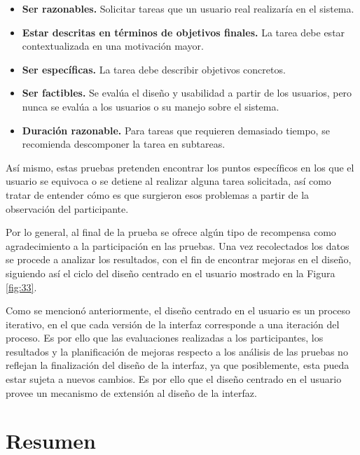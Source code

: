 \begin{itemize}
  \item \textbf{Ser razonables.} Solicitar tareas que un usuario real realizaría en el sistema.
  \item \textbf{Estar descritas en términos de objetivos finales.} La tarea debe estar contextualizada en una motivación mayor.
  \item \textbf{Ser específicas.} La tarea debe describir objetivos concretos.
  \item \textbf{Ser factibles.} Se evalúa el diseño y usabilidad a partir de los usuarios, pero nunca se evalúa a los usuarios o su manejo sobre el sistema.
  \item \textbf{Duración razonable.} Para tareas que requieren demasiado tiempo, se recomienda descomponer la tarea en subtareas.
\end{itemize}

Así mismo, estas pruebas pretenden encontrar los puntos específicos en los que el usuario se equivoca o se detiene al realizar alguna tarea solicitada, así como tratar de entender cómo es que surgieron esos problemas a partir de la observación del participante.

Por lo general, al final de la prueba se ofrece algún tipo de recompensa como agradecimiento a la participación en las pruebas. Una vez recolectados los datos se procede a analizar los resultados, con el fin de encontrar mejoras en el diseño, siguiendo así el ciclo del diseño centrado en el usuario mostrado en la Figura \ref{fig:33}.

Como se mencionó anteriormente, el diseño centrado en el usuario es un proceso iterativo, en el que cada versión de la interfaz corresponde a una iteración del proceso. Es por ello que las evaluaciones realizadas a los participantes, los resultados y la planificación de mejoras respecto a los análisis de las pruebas no reflejan la finalización del diseño de la interfaz, ya que posiblemente, esta pueda estar sujeta a nuevos cambios. Es por ello que el diseño centrado en el usuario provee un mecanismo de extensión al diseño de la interfaz.


\section{Resumen}
\label{ResumenCap3}

